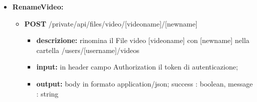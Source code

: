 {{\begin{itemize}
		\item \textbf{RenameVideo:}
			\begin{itemize}
			\item   \textbf{POST} /private/api/files/video/[videoname]/[newname] 
				\begin{itemize} 
				\item \textbf{descrizione:} rinomina il File video [videoname] con [newname] nella cartella /users/[username]/videos
				\item \textbf{input:} in header campo Authorization il token di autenticazione;
				\item \textbf{output:} body in formato application/json; success : boolean, message : string
				\end{itemize}
			\end{itemize}

	\end{itemize}
	}
}
	
	
	
	
	
	
	
	
	
	
	
	
	
	
	